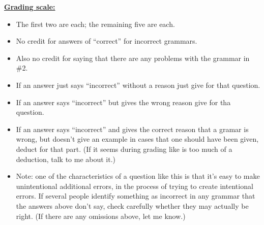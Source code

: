 \documentclass[11pt,fleqn]{article}
\begin{document}
  \begin{info}{\textbf{\underline{Grading scale:}}}

    \begin{itemize}

      \addtolength{\itemsep}{2mm}

      \item The first two are  each; the remaining five are
             each.

      \item No credit for answers of ``correct'' for incorrect grammars.

      \item Also no credit for saying that there are any problems with the
            grammar in \#2.

      \item If an answer just says ``incorrect'' without a reason just give
             for that question.

      \item If an answer says ``incorrect'' but gives the wrong reason
            give  for tha question.

      \item If an answer says ``incorrect'' and gives the correct reason
            that a gramar is wrong, but doesn't give an example in cases
            that one should have been given, deduct  for that part.
            (If it seems during grading like  is too much of a
            deduction, talk to me about it.)

      \item Note: one of the characteristics of a question like this is that
            it's easy to make unintentional additional errors, in the
            process of trying to create intentional errors.  If several
            people identify something as incorrect in any grammar that the
            answers above don't say, check carefully whether they may
            actually be right.  (If there are any omissions above, let me
            know.)

    \end{itemize}

  \end{info}
\end{document}
